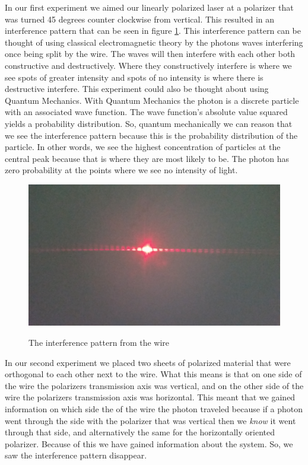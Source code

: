 \documentclass[12pt letterpaper]{article}
\begin{document}
In our first experiment we aimed our linearly polarized laser at a polarizer that was turned 45 degrees counter clockwise from vertical. This resulted in an interference pattern that can be seen in figure \ref{fig:interference}. This interference pattern can be thought of using classical electromagnetic theory by the photons waves interfering once being split by the wire. The waves will then interfere with each other both constructive and destructively. Where they constructively interfere is where we see spots of greater intensity and spots of no intensity is where there is destructive interfere. This experiment could also be thought about using Quantum Mechanics. With Quantum Mechanics the photon is a discrete particle with an associated wave function. The wave function's absolute value squared yields a probability distribution. So, quantum mechanically we can reason that we see the interference pattern because this is the probability distribution of the particle. In other words, we see the highest concentration of particles at the central peak because that is where they are most likely to be. The photon has zero probability at the points where we see no intensity of light. 

\begin{figure}[H]
  \caption{The interference pattern from the wire}
  \centering
    \includegraphics[width=.75\textwidth]{interference.jpg}
    \label{fig:interference}
\end{figure}

In our second experiment we placed two sheets of polarized material that were orthogonal to each other next to the wire. What this means is that on one side of the wire the polarizers transmission axis was vertical, and on the other side of the wire the polarizers transmission axis was horizontal. This meant that we gained information on which side the of the wire the photon traveled because if a photon went through the side with the polarizer that was vertical then we \textit{know} it went through that side, and alternatively the same for the horizontally oriented polarizer. Because of this we have gained information about the system. So, we saw the interference pattern disappear.  
\end{document}
